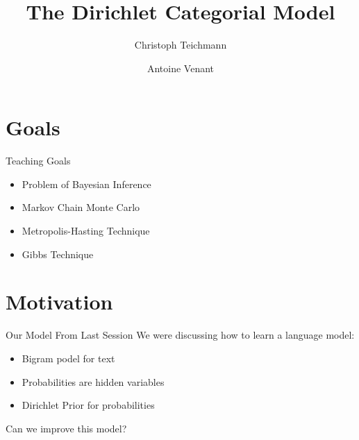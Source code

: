 \documentclass[11pt]{beamer}
\author{Christoph Teichmann \and Antoine Venant}
\title{The Dirichlet Categorial Model}
\subtitle{}
\institute{}
\date{}
\begin{document}
	\centering
	
	
	\begin{frame}
		\maketitle
	\end{frame}
	
	\section{Goals}
	
	\begin{frame}{Teaching Goals}
		\begin{itemize}
			\item Problem of Bayesian Inference
			\item Markov Chain Monte Carlo
			\item Metropolis-Hasting Technique
			\item Gibbs Technique
		\end{itemize}
	\end{frame}
	
	\section{Motivation}
	
	\begin{frame}{Our Model From Last Session}
		We were discussing how to learn a language model:
		
		\vspace{10pt} \begin{itemize}
			\item Bigram podel for text
			\item Probabilities are hidden variables
			\item Dirichlet Prior for probabilities
		\end{itemize}
		
		\vspace{10pt} Can we improve this model?
	\end{frame}
		
\end{document}
